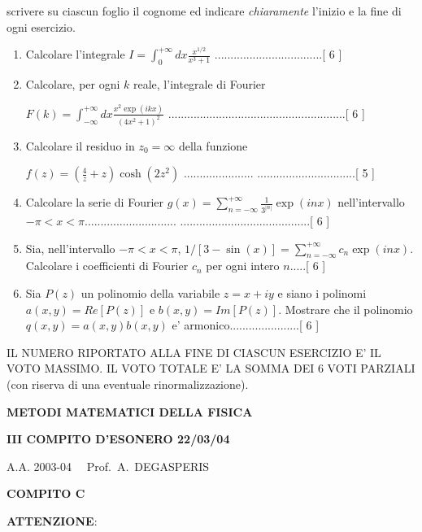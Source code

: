 \documentclass[,12pt]{article}
\begin{document}
\noindent
scrivere su ciascun foglio il cognome ed indicare
\emph{chiaramente} l'inizio e la fine di ogni esercizio.
\vspace{20pt}
\noindent
\begin{enumerate}
\item Calcolare l'integrale $I=\int_0^{+\infty}dx\frac{x^{1/2}}{x^3+1}$
..................................[ 6 ] 
\item Calcolare, per ogni $k$ reale, l'integrale di Fourier
 
$F(k)=\int_{-\infty}^{+\infty}dx\frac{x^2\exp(ikx)}{(4x^2+1)^2}$
........................................................[ 6 ]
\item Calcolare il residuo in $z_0=\infty$ della funzione

$f(z)=(\frac{4}{z}+z) \cosh(2z^2)$ ......................
...............................[ 5 ]  
\item Calcolare la serie di Fourier 
$g(x)=\sum_{n=-\infty}^{+\infty} \frac{1}{3^{|n|}}\exp(inx)$
nell'intervallo $-\pi<x<\pi$.............................
.........................................[ 6 ]
\item Sia, nell'intervallo $-\pi<x<\pi$, $1/[3-\sin(x)
]=\sum_{n=-\infty}^{+\infty} c_n \exp(inx)$. Calcolare i coefficienti di
Fourier $c_n$ per ogni intero $n$.....[ 6 ]
\item Sia $P(z)$ un polinomio della variabile
$z=x+iy$  e siano i polinomi $a(x,y)=Re[P(z)]$ e
$b(x,y)=Im[P(z)]$. Mostrare che il polinomio
$q(x,y)=a(x,y) b(x,y)$ e' armonico......................[ 6 ]

\end{enumerate}

\noindent IL NUMERO RIPORTATO ALLA FINE DI CIASCUN ESERCIZIO
E' IL VOTO MASSIMO. IL VOTO TOTALE E' LA SOMMA DEI 6 VOTI
PARZIALI (con riserva di una eventuale rinormalizzazione).

\newpage

\centerline{\bf{METODI MATEMATICI DELLA FISICA}}

\centerline{\bf{III COMPITO D'ESONERO 22/03/04}}

\centerline{A.A. 2003-04 \ \ Prof.\ A.\ DEGASPERIS}
\centerline{\bf{COMPITO  C}}
\vspace{20pt}
\noindent
{\bf ATTENZIONE}:
\end{document}
